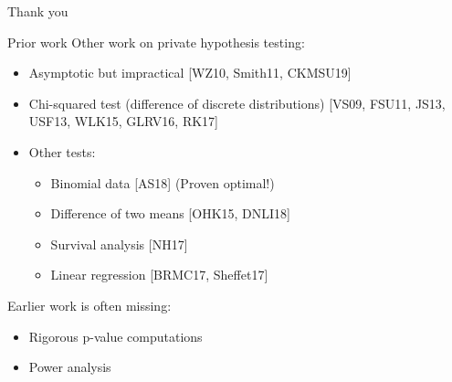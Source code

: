 \documentclass{beamer}
\begin{document}
\begin{frame}{}
    \begin{center}
        \Huge Thank you
    \end{center}    
\end{frame}

\begin{frame}{Prior work}
Other work on private hypothesis testing:\pause
\begin{itemize}
\item Asymptotic but impractical [WZ10, Smith11, CKMSU19] \pause
\item Chi-squared test (difference of discrete distributions) [VS09, FSU11, JS13, USF13, WLK15, GLRV16, RK17] \pause
\item Other tests: \pause
\begin{itemize}
\item Binomial data [AS18] (Proven optimal!) \pause
\item Difference of two means [OHK15, DNLI18] \pause
\item Survival analysis [NH17] \pause
\item Linear regression [BRMC17, Sheffet17] \pause
\end{itemize}
\end{itemize}
Earlier work is often missing: \pause
\begin{itemize}
\item Rigorous p-value computations \pause
\item Power analysis
\end{itemize}
\end{frame}
\end{document}
